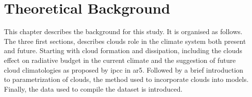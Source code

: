 \setcounter{chapter}{1} 
\chapter{Theoretical Background } \label{ch:theoretical_back}
This chapter describes the background for this study. It is organised as follows. The three first sections, describes clouds role in the climate system both present and future. Starting with cloud formation and dissipation, including the clouds effect on radiative budget in the current climate and the suggestion of future cloud climatologies as proposed by \acrfull{ipcc} in \acrfull{ar5}. Followed by a brief introduction to parametrization of clouds, the method used to incorporate clouds into models.
Finally, the data used to compile the dataset is introduced. 









